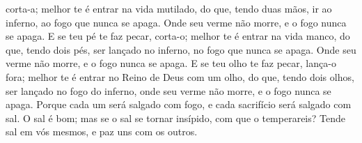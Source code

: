 {{} corta-a; melhor te é entrar na vida mutilado, do que, tendo duas mãos, ir ao inferno, ao fogo que nunca se apaga.
  Onde seu verme não morre, e o fogo nunca se apaga.
  E se teu pé te faz pecar, corta-o; melhor te é entrar na vida manco, do que, tendo dois pés, ser lançado no inferno, no fogo que nunca se apaga.
  Onde seu verme não morre, e o fogo nunca se apaga.
  E se teu olho te faz pecar, lança-o fora; melhor te é entrar no Reino de Deus com um olho, do que, tendo dois olhos, ser lançado no fogo do inferno,
  onde seu verme não morre, e o fogo nunca se apaga.
  Porque cada um será salgado com fogo, e cada sacrifício será salgado com sal.
  O sal é bom; mas se o sal se tornar insípido, com que o temperareis? Tende sal em vós mesmos, e paz uns com os outros.
\par }

